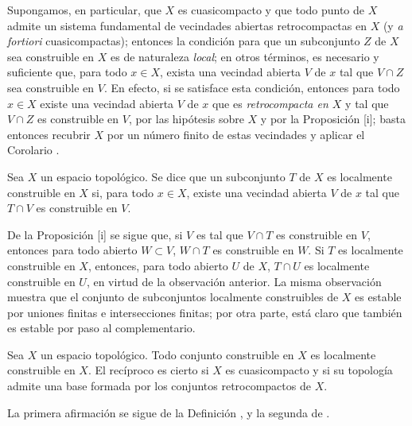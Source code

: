 \begin{env}[9.1.10]
\label{0.9.1.10}
\label{0.9.1.10-fr}
Supongamos, en particular, que $X$ es cuasicompacto y que todo punto
de $X$ admite un sistema fundamental de vecindades abiertas retrocompactas en $X$ (y \emph{a fortiori} cuasicompactas); entonces la condición para que un subconjunto $Z$ de $X$ sea construible en $X$ es de naturaleza \emph{local}; en otros términos, es necesario y suficiente que, para todo $x\in X$, exista una vecindad abierta $V$ de $x$ tal que $V\cap Z$ sea construible en $V$.
En efecto, si se satisface esta condición, entonces para todo $x\in X$ existe una vecindad abierta $V$ de $x$ que es \emph{retrocompacta en $X$} y tal que $V\cap Z$ es construible en $V$, por las hipótesis sobre $X$ y por la Proposición [i]; basta entonces recubrir $X$ por un número finito de estas vecindades y aplicar el Corolario .
\end{env}

\begin{definition}[9.1.11]
\label{0.9.1.11}
\label{0.9.1.11-fr}
Sea $X$ un espacio topológico.
Se dice que un subconjunto $T$ de $X$ es localmente construible en $X$ si, para todo $x\in X$, existe una vecindad abierta $V$ de $x$ tal que $T\cap V$ es construible en $V$.
\end{definition}

De la Proposición [i] se sigue que, si $V$ es tal que $V\cap T$ es construible en $V$, entonces para todo abierto $W\subset V$, $W\cap T$ es construible en $W$.
Si $T$ es localmente construible en $X$, entonces, para todo abierto $U$ de $X$, $T\cap U$ es localmente construible en $U$, en virtud de la observación anterior.
La misma observación muestra que el conjunto de subconjuntos localmente construibles de $X$ es estable por uniones finitas e intersecciones finitas; por otra parte, está claro que también es estable por paso al complementario.

\begin{proposition}[9.1.12]
\label{0.9.1.12}
\label{0.9.1.12-fr}
Sea $X$ un espacio topológico.
Todo conjunto construible en $X$ es localmente construible en $X$.
El recíproco es cierto si $X$ es cuasicompacto y si su topología admite una base formada por los conjuntos retrocompactos de $X$.
\end{proposition}


La primera afirmación se sigue de la Definición , y la segunda de .


